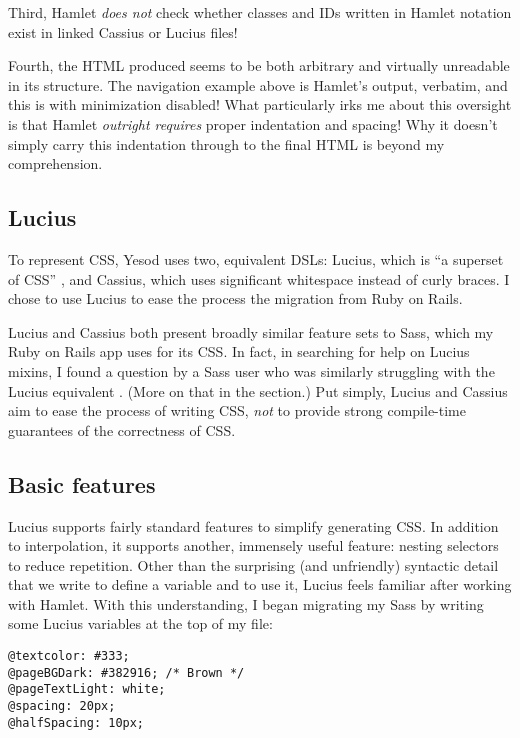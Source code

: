 Third, Hamlet \emph{does not} check whether classes and IDs written in Hamlet notation exist in linked Cassius or Lucius files!

Fourth, the HTML produced seems to be both arbitrary and virtually unreadable in its structure. The navigation example above is Hamlet's output, verbatim, and this is with minimization disabled! What particularly irks me about this oversight is that Hamlet \emph{outright requires} proper indentation and spacing! Why it doesn't simply carry this indentation through to the final HTML is beyond my comprehension.

\subsection{Lucius}
To represent CSS, Yesod uses two, equivalent DSLs: Lucius, which is ``a superset of CSS'' \cite{...}, and Cassius, which uses significant whitespace instead of curly braces. I chose to use Lucius to ease the process the migration from Ruby on Rails.

Lucius and Cassius both present broadly similar feature sets to Sass, which my Ruby on Rails app uses for its CSS. In fact, in searching for help on Lucius mixins, I found a question by a Sass user who was similarly struggling with the Lucius equivalent \cite{...}. (More on that in the  section.) Put simply, Lucius and Cassius aim to ease the process of writing CSS, \emph{not} to provide strong compile-time guarantees of the correctness of CSS.

\subsection{Basic features}

Lucius supports fairly standard features to simplify generating CSS. In addition to interpolation, it supports another, immensely useful feature: nesting selectors to reduce repetition. Other than the surprising (and unfriendly) syntactic detail that we write  to define a variable and  to use it, Lucius feels familiar after working with Hamlet. With this understanding, I began migrating my Sass by writing some Lucius variables at the top of my  file:

\begin{Verbatim}
@textcolor: #333;
@pageBGDark: #382916; /* Brown */
@pageTextLight: white;
@spacing: 20px;
@halfSpacing: 10px;
\end{Verbatim}

